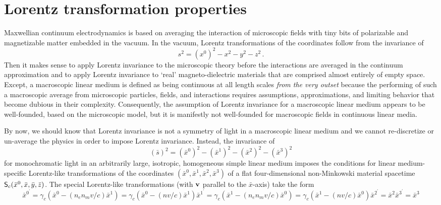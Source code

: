 \documentclass[twocolumn,amssymb,eqsecnum,aps,pra]{revtex4-2}
\begin{document}
\section{Lorentz transformation properties}
\par
Maxwellian continuum electrodynamics is based on averaging the
interaction of microscopic fields with tiny bits of polarizable 
and magnetizable matter embedded in the vacuum.
In the vacuum, Lorentz transformations of the coordinates follow from 
the invariance of
\begin{equation}
s^2=(x^0)^2-x^2-y^2-z^2 \, .
\label{EQq8.01}
\end{equation}
Then it makes sense to apply Lorentz invariance to the microscopic 
theory before the interactions are averaged in the continuum 
approximation and to apply Lorentz invariance to `real' 
magneto-dielectric materials that are comprised almost entirely 
of empty space.
Except, a macroscopic linear medium is defined as being continuous
at all length scales \textit{from the very outset} because the
performing of such a macroscopic average from microscopic particles,
fields, and interactions requires assumptions, approximations,
and limiting behavior that become dubious in their complexity.
Consequently, the assumption of Lorentz invariance for a macroscopic
linear medium appears to be well-founded, based on the microscopic
model, but
it is manifestly not well-founded for macroscopic fields in continuous
linear media.
\par
By now, we should know that Lorentz invariance is not a symmetry of
light in a macroscopic linear medium \cite{BIFinn} and we cannot
re-discretize or un-average the physics in order to impose Lorentz
invariance.
Instead, the invariance of 
\begin{equation}
(\bar s )^2=(\bar x^0)^2-(\bar x^1)^2-(\bar x^2)^2-(\bar x^3)^2
\label{EQq8.02}
\end{equation}
for monochromatic light in an arbitrarily large,
isotropic, homogeneous simple linear medium imposes the conditions for
linear medium-specific Lorentz-like transformations of the coordinates
$(\bar x^0,\bar x^1,\bar x^2,\bar x^3)$ of a flat four-dimensional
non-Minkowski material 
spacetime ${\sf S}_c(\bar x^0,\bar x,\bar y,\bar z)$.
The special Lorentz-like transformations (with ${\bf v}$ parallel to
the $\bar x$-axis) take the form \begin{subequations}
\begin{equation}
\bar x^{0^{\prime}}=\gamma_c\left (\bar x^0-(n_en_mv/c)\bar x^1\right )
=\gamma_c\left ( \bar x^0-(nv/c)\bar x^1 \right )
\label{EQq8.03a}
\end{equation}
\begin{equation}
\bar x^{1^{\prime}}=\gamma_c\left (\bar x^1-(n_en_mv/c)\bar x^0\right )
=\gamma_c\left ( \bar x^1-(nv/c)\bar x^0 \right )
\label{EQq8.03b}
\end{equation}
\begin{equation}
\bar x^{2^{\prime}}=\bar x^2
\label{EQq8.03c}
\end{equation}
\begin{equation}
\bar x^{3^{\prime}}=\bar x^3
\label{EQq8.03d}
\end{equation}
\label{EQq8.03}
\end{subequations}
\end{document}
